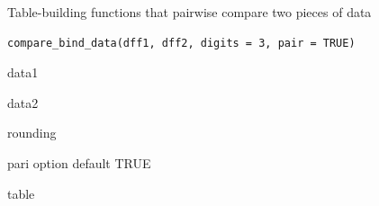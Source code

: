 \documentclass[a4paper]{book}
\begin{document}
%
\begin{Description}
Table-building functions that pairwise compare two pieces of data
\end{Description}
%
\begin{Usage}
\begin{verbatim}
compare_bind_data(dff1, dff2, digits = 3, pair = TRUE)
\end{verbatim}
\end{Usage}
%
\begin{Arguments}
\begin{ldescription}
\item[\code{dff1}] data1

\item[\code{dff2}] data2

\item[\code{digits}] rounding

\item[\code{pair}] pari option default TRUE
\end{ldescription}
\end{Arguments}
%
\begin{Value}
table
\end{Value}
\end{document}
